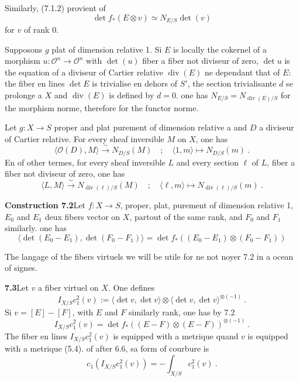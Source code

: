 \documentclass[12pt,a4paper]{article}
\theoremstyle{plain}
\theoremstyle{definition}
\theoremstyle{remark}
\DeclareMathOperator{\divm}{div}
\newcommand{\calO}{\mathcal{O}}
\newcommand{\simto}{\xrightarrow{\sim}}
\begin{document}
Similarly, (7.1.2) provient of
\begin{equation}
\label{eq:7.1.6}
\det f_*(E \otimes v) \simeq N_{E/S} \det(v)
\end{equation}
for $v$ of rank 0.

Supposons $g$ plat of dimension relative 1. Si $E$ is locally the cokernel of a morphism $u: \calO^n \to \calO^n$ with $\det(u)$ fiber a fiber not diviseur of zero, $\det u$ is the equation of a diviseur of Cartier relative $\divm(E)$ ne dependant that of $E$: the fiber en lines $\det E$ is trivialise en dehors of $S'$, the section trivialisante $d$ se prolonge a $X$ and $\divm(E)$ is defined by $d = 0$. one has $N_{E/S} = N_{\divm(E)/S}$ for the morphism norme, therefore for the functor norme.

Let $g: X \to S$ proper and plat purement of dimension relative a and $D$ a diviseur of Cartier relative. For every sheaf inversible $M$ on $X$, one has
\[
\langle \calO(D), M \rangle \simto N_{D/S}(M) \quad ; \quad \langle 1, m \rangle \longmapsto N_{D/S}(m) \ .
\]
En of other termes, for every sheaf inversible $L$ and every section $\ell$ of $L$, fiber a fiber not diviseur of zero, one has
\[
\langle L, M \rangle \simto N_{\divm(\ell)/S}(M) \quad ; \quad \langle \ell, m \rangle \longmapsto N_{\divm(\ell)/S}(m) \ .
\]

\medskip
\noindent\textbf{Construction 7.2}\quad Let $f: X \to S$, proper, plat, purement of dimension relative 1, $E_0$ and $E_1$ deux fibers vector on $X$, partout of the same rank, and $F_0$ and $F_1$ similarly. one has
\begin{equation}
\label{eq:7.2.1}
\langle \det(E_0 - E_1), \det(F_0 - F_1) \rangle = \det f_*((E_0 - E_1) \otimes (F_0 - F_1))
\end{equation}

The langage of the fibers virtuels we will be utile for ne not noyer 7.2 in a ocean of signes.

\medskip
\noindent\textbf{7.3}\quad Let $v$ a fiber virtuel on $X$. One defines
\begin{equation}
\label{eq:7.3.1}
I_{X/S} c_1^2(v) := \langle \det v, \det v \rangle \otimes \langle \det v, \det v \rangle^{\otimes(-1)} \ .
\end{equation}
Si $v = [E] - [F]$, with $E$ and $F$ similarly rank, one has by 7.2
\begin{equation}
\label{eq:7.3.2}
I_{X/S} c_1^2(v) = \det f_*((E - F) \otimes (E - F))^{\otimes(-1)} \ .
\end{equation}
The fiber en lines $I_{X/S} c_1^2(v)$ is equipped with a metrique quand $v$ is equipped with a metrique (5.4). of after 6.6, sa form of courbure is
\begin{equation}
\label{eq:7.3.3}
c_1(I_{X/S} c_1^2(v)) = -\int_{X/S} c_1^2(v) \ .
\end{equation}
\end{document}
